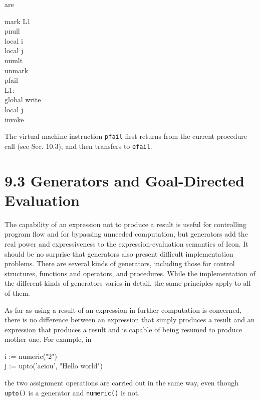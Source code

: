 are

\begin{iconcode}
\>mark\>\>\> L1\\
\>pnull\\
\>local\>\>\> i\\
\>local\>\>\> j\\
\>numlt\\
\>unmark\\
\>pfail\\
L1:\\
\>global\>\>\> write\\
\>local\>\>\> j\\
\>invoke\>\>
\end{iconcode}

The virtual machine instruction \texttt{pfail} first returns from the
current procedure call (see Sec. 10.3), and then transfers to
\texttt{efail}.


\section[9.3 Generators and Goal{}-Directed Evaluation]{9.3 Generators and Goal-Directed Evaluation}

The capability of an expression not to produce a result is useful for
controlling program flow and for bypassing unneeded computation, but
generators add the real power and expressiveness to the
expression-evaluation semantics of Icon. It should be no surprise that
generators also present difficult implementation problems. There are
several kinds of generators, including those for control structures,
functions and operators, and procedures. While the implementation of
the different kinds of generators varies in detail, the same
principles apply to all of them.


As far as using a result of an expression in further computation is
concerned, there is no difference between an expression that simply
produces a result and an expression that produces a result and is
capable of being resumed to produce mother one. For example, in

\begin{iconcode}
\>i := numeric("2")\\
\>j := upto('aeiou', "Hello world")
\end{iconcode}

\noindent the two assignment operations are carried out in the same
way, even though \texttt{upto()} is a generator and \texttt{numeric()}
is not.

